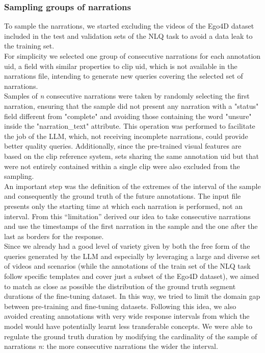 \documentclass[10pt,twocolumn,letterpaper]{article}
\begin{document}
\subsubsection{Sampling groups of narrations}
To sample the narrations, we started excluding the videos of the Ego4D dataset included in the test and validation sets of the NLQ task to avoid a data leak to the training set.\\ 
For simplicity we selected one group of consecutive narrations for each annotation uid, a field with similar properties to clip uid, which is not available in the narrations file, intending to generate new queries covering the selected set of narrations.\\
Samples of \textit{n} consecutive narrations were taken by randomly selecting the first narration, ensuring that the sample did not present any narration with a "status" field different from "complete" and avoiding those containing the word "unsure" inside the "narration\_text" attribute. This operation was performed to facilitate the job of the LLM, which, not receiving incomplete narrations, could provide better quality queries. Additionally, since the pre-trained visual features are based on the clip reference system, sets sharing the same annotation uid but that were not entirely contained within a single clip were also excluded from the sampling.  \\
An important step was the definition of the extremes of the interval of the sample and consequently the ground truth of the future annotations. The input file presents only the starting time at which each narration is performed, not an interval. From this “limitation” derived our idea to take consecutive narrations and use the timestamps of the first narration in the sample and the one after the last as borders for the response.\\
Since we already had a good level of variety given by both the free form of the queries generated by the LLM and especially by leveraging a large and diverse set of videos and scenarios (while the annotations of the train set of the NLQ task follow specific templates and cover just a subset of the Ego4D dataset), we aimed to match as close as possible the distribution of the ground truth segment durations of the fine-tuning dataset. In this way, we tried to limit the domain gap between pre-training and fine-tuning datasets. Following this idea, we also avoided creating annotations with very wide response intervals from which the model would have potentially learnt less transferable concepts. We were able to regulate the ground truth duration by modifying the cardinality of the sample of narrations \textit{n}: the more consecutive narrations the wider the interval.\\
\end{document}
